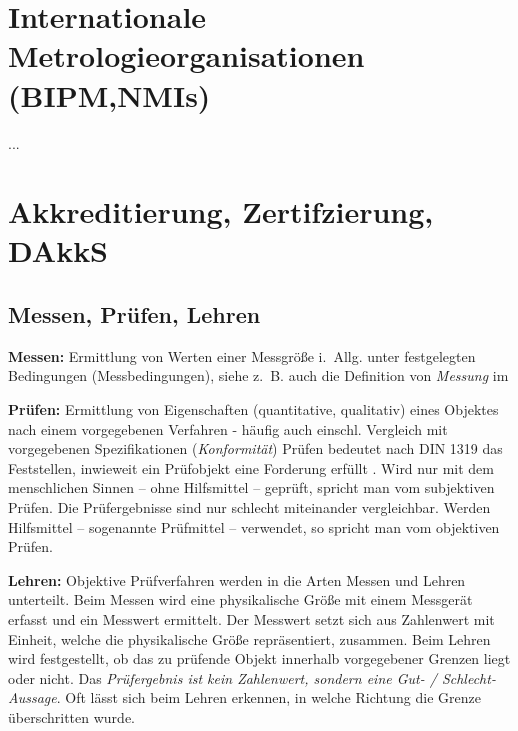 % 
\section{Internationale Metrologieorganisationen (BIPM,NMIs)}
...
\section{Akkreditierung, Zertifzierung, DAkkS}
\subsection{Messen, Prüfen, Lehren}
\textbf{Messen:} Ermittlung von Werten einer Messgröße i.~Allg. unter festgelegten Bedingungen (Messbedingungen), siehe z.~B. auch die Definition von \textit{Messung} im \cite{VIM08}

\textbf{Prüfen:} Ermittlung von Eigenschaften (quantitative, qualitativ) eines Objektes nach einem vorgegebenen Verfahren - häufig auch einschl. Vergleich mit vorgegebenen Spezifikationen (\textit{Konformität}) Prüfen bedeutet nach DIN 1319 das Feststellen, inwieweit ein Prüfobjekt eine Forderung erfüllt \cite{DIN1319}. Wird nur mit dem menschlichen Sinnen – ohne Hilfsmittel – geprüft, spricht man vom subjektiven Prüfen. Die Prüfergebnisse sind nur schlecht miteinander vergleichbar. Werden Hilfsmittel – sogenannte Prüfmittel – verwendet, so spricht man vom objektiven Prüfen.

\textbf{Lehren:} Objektive Prüfverfahren werden in die Arten Messen und Lehren unterteilt. Beim Messen wird eine physikalische Größe mit einem Messgerät erfasst und ein Messwert ermittelt. Der Messwert setzt sich aus Zahlenwert mit Einheit, welche die physikalische Größe repräsentiert, zusammen. Beim Lehren wird festgestellt, ob das zu prüfende Objekt innerhalb vorgegebener Grenzen liegt oder nicht. Das \textit{Prüfergebnis ist kein Zahlenwert, sondern eine Gut- / Schlecht-Aussage}. Oft lässt sich beim Lehren erkennen, in welche Richtung die Grenze überschritten wurde. 

